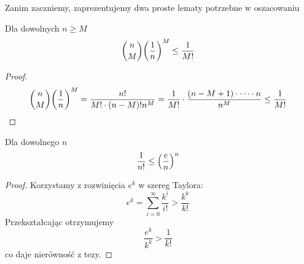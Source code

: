 Zanim zaczniemy, zaprezentujemy dwa proste lematy potrzebne w oszacowaniu
\begin{lemma}
    Dla dowolnych \( n \geq M \)
    \[
        \binom{n}{M} \pars{\frac{1}{n}}^M \leq \frac{1}{M!}
    \]
\end{lemma}
\begin{proof}
    \[ 
        \binom{n}{M} \pars{\frac{1}{n}}^M = \frac{n!}{M!\cdot(n-M)!n^M} = 
        \frac{1}{M!}\cdot\frac{(n-M+1)\cdot \dots \cdot n}{n^M} \leq \frac{1}{M!}
    \]
\end{proof}

\begin{lemma}
    Dla dowolnego \( n \)
    \[
        \frac{1}{n!} \leq \left(\frac{e}{n}\right)^n
    \]
\end{lemma}
\begin{proof}
    Korzystamy z rozwinięcia \( e^k \) w szereg Taylora:
    \[
        e^k = \sum_{i=0}^\infty \frac{k^i}{i!} > \frac{k^k}{k!}
    \]
    Przekształcając otrzymujemy
    \[
        \frac{e^k}{k^k} > \frac{1}{k!}
    \]
    co daje nierówność z tezy.
\end{proof}

